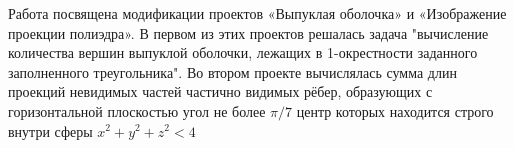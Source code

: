 Работа посвящена модификации проектов «Выпуклая оболочка» и
«Изображение проекции полиэдра». В первом из этих проектов решалась
задача "вычисление количества вершин выпуклой оболочки, лежащих в 
1-окрестности заданного заполненного треугольника". 
Во втором проекте вычислялась сумма длин проекций невидимых частей частично 
 видимых рёбер, образующих с горизонтальной плоскостью угол не более 
 $\pi/7$ центр которых находится строго внутри сферы $x^2+y^2+z^2<4$
